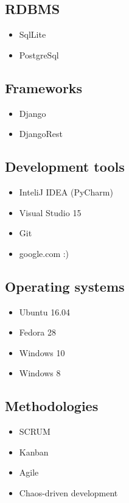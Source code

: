 \documentclass[12pt,a4paper,sans]{moderncv}        %
\begin{document}
\subsection{RDBMS}
\begin{multicols}{2}
\begin{itemize}
\item SqlLite
\item PostgreSql
\end{itemize}
\end{multicols}

\subsection{Frameworks}
\begin{multicols}{2}
\begin{itemize}
\item Django \item DjangoRest
\end{itemize}
\end{multicols}

\subsection{Development tools}
\begin{multicols}{2}
\begin{itemize}
\item InteliJ IDEA (PyCharm)
\item Visual Studio 15 
\item Git 
\item google.com :)
\end{itemize}
\end{multicols}

\subsection{Operating systems}
\begin{multicols}{2}
\begin{itemize}
\item Ubuntu 16.04 
\item Fedora 28 
\item Windows 10 
\item Windows 8
\end{itemize}
\end{multicols}

\subsection{Methodologies}
\begin{multicols}{2}
\begin{itemize}
\item SCRUM
\item Kanban 
\item Agile 
\item Chaos-driven development
\end{itemize}
\end{multicols}
\end{document}
